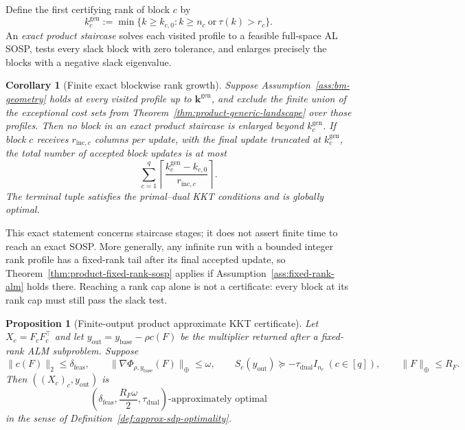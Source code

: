 \documentclass[11pt]{article}
\newtheorem{proposition}{Proposition}
\newtheorem{corollary}{Corollary}
\theoremstyle{definition}
\theoremstyle{remark}
\begin{document}
Define the first certifying rank of block $c$ by
\begin{equation}
  k_c^{\mathrm{gen}}
  :=\min\{k\geq k_{c,0}: k\geq n_c\ \text{or}\ \tau(k)>r_c\}.
  \label{eq:product-first-generic-rank}
\end{equation}
An \emph{exact product staircase} solves each visited profile to a feasible
full-space AL SOSP, tests every slack block with zero tolerance, and enlarges
precisely the blocks with a negative slack eigenvalue.

\begin{corollary}[Finite exact blockwise rank growth]
\label{cor:product-exact-rank-growth}
Suppose Assumption~\ref{ass:bm-geometry} holds at every visited profile up to
$\mathbf k^{\mathrm{gen}}$, and exclude the finite union of the exceptional
cost sets from Theorem~\ref{thm:product-generic-landscape} over those
profiles.  Then no block in an exact product staircase is enlarged beyond
$k_c^{\mathrm{gen}}$.  If block $c$ receives
$r_{\mathrm{inc},c}$ columns per update, with the final update truncated at
$k_c^{\mathrm{gen}}$, the total number of accepted block updates is at most
\begin{equation}
  \sum_{c=1}^q
  \left\lceil
    \frac{k_c^{\mathrm{gen}}-k_{c,0}}{r_{\mathrm{inc},c}}
  \right\rceil.
  \label{eq:product-rank-update-bound}
\end{equation}
The terminal tuple satisfies the primal--dual KKT conditions and is globally
optimal.
\end{corollary}

This exact statement concerns staircase stages; it does not assert finite time
to reach an exact SOSP.  More generally, any infinite run with a bounded
integer rank profile has a fixed-rank tail after its final accepted update, so
Theorem~\ref{thm:product-fixed-rank-sosp} applies if
Assumption~\ref{ass:fixed-rank-alm} holds there.  Reaching a rank cap alone is
not a certificate: every block at its rank cap must still pass the slack test.

\begin{proposition}[Finite-output product approximate KKT certificate]
\label{prop:finite-output-kkt}
Let $X_c=F_cF_c^\top$ and let
$y_{\mathrm{out}}=y_{\mathrm{base}}-\rho c(F)$ be the multiplier returned
after a fixed-rank ALM subproblem.  Suppose
\begin{equation}
  \|c(F)\|_2\leq\delta_{\mathrm{feas}},
  \qquad
  \|\nabla\Phi_{\rho,y_{\mathrm{base}}}(F)\|_\oplus\leq\omega,
  \qquad
  S_c(y_{\mathrm{out}})\succeq-\tau_{\mathrm{dual}}I_{n_c}\ (c\in[q]),
  \qquad
  \|F\|_\oplus\leq R_F.
  \label{eq:finite-kkt-residuals}
\end{equation}
Then $((X_c)_c,y_{\mathrm{out}})$ is
\begin{equation}
  \left(
    \delta_{\mathrm{feas}},
    \frac{R_F\omega}{2},
    \tau_{\mathrm{dual}}
  \right)
  \text{-approximately optimal}
  \label{eq:finite-kkt-tolerances}
\end{equation}
in the sense of Definition~\ref{def:approx-sdp-optimality}.
\end{proposition}
\end{document}
